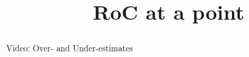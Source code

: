 \documentclass[handout]{ximera}
\title{RoC at a point}
\begin{document}
\begin{abstract} Video: Over- and Under-estimates %
\end{abstract}

\maketitle

\end{document}
